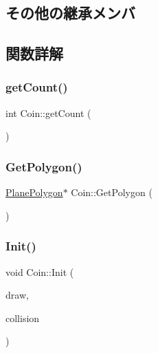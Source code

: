 \subsection*{その他の継承メンバ}


\subsection{関数詳解}
\mbox{\label{class_coin_a5b302d3ad7be44267e1f4e6a54b0f23c}} 
\subsubsection{\texorpdfstring{get\+Count()}{getCount()}}
{\footnotesize\ttfamily int Coin\+::get\+Count (\begin{DoxyParamCaption}{ }\end{DoxyParamCaption})\hspace{0.3cm}{\ttfamily [inline]}}

\mbox{\label{class_coin_af435ca01cc92d7214e7bc94ed486ab7b}} 
\subsubsection{\texorpdfstring{Get\+Polygon()}{GetPolygon()}}
{\footnotesize\ttfamily \mbox{\hyperlink{class_plane_polygon}{Plane\+Polygon}}$\ast$ Coin\+::\+Get\+Polygon (\begin{DoxyParamCaption}{ }\end{DoxyParamCaption})\hspace{0.3cm}{\ttfamily [inline]}}

\mbox{\label{class_coin_aecb007762f15ecc91cd6a699e60c2e19}} 
\subsubsection{\texorpdfstring{Init()}{Init()}}
{\footnotesize\ttfamily void Coin\+::\+Init (\begin{DoxyParamCaption}\item[{\mbox{\hyperlink{class_draw_base}{Draw\+Base}} $\ast$}]{draw,  }\item[{\mbox{\hyperlink{class_collision_base}{Collision\+Base}} $\ast$}]{collision }\end{DoxyParamCaption})}

